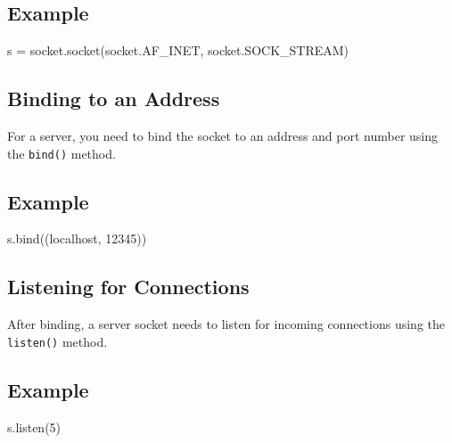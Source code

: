 \documentclass[
  letterpaper,
  DIV=11,
  numbers=noendperiod]{scrreprt}
\newenvironment{Shaded}{\begin{snugshade}}{\end{snugshade}}
\newcommand{\DecValTok}[1]{\textcolor[rgb]{0.68,0.00,0.00}{#1}}
\newcommand{\NormalTok}[1]{\textcolor[rgb]{0.00,0.23,0.31}{#1}}
\newcommand{\OperatorTok}[1]{\textcolor[rgb]{0.37,0.37,0.37}{#1}}
\newcommand{\StringTok}[1]{\textcolor[rgb]{0.13,0.47,0.30}{#1}}
\begin{document}
\subsection{Example}\label{example-10}

\begin{Shaded}
\begin{Highlighting}[]
\NormalTok{s }\OperatorTok{=}\NormalTok{ socket.socket(socket.AF\_INET, socket.SOCK\_STREAM)}
\end{Highlighting}
\end{Shaded}

\subsection{Binding to an Address}\label{binding-to-an-address}

For a server, you need to bind the socket to an address and port number
using the \texttt{bind()} method.

\subsection{Example}\label{example-11}

\begin{Shaded}
\begin{Highlighting}[]
\NormalTok{s.bind((}\StringTok{\textquotesingle{}localhost\textquotesingle{}}\NormalTok{, }\DecValTok{12345}\NormalTok{))}
\end{Highlighting}
\end{Shaded}

\subsection{Listening for Connections}\label{listening-for-connections}

After binding, a server socket needs to listen for incoming connections
using the \texttt{listen()} method.

\subsection{Example}\label{example-12}

\begin{Shaded}
\begin{Highlighting}[]
\NormalTok{s.listen(}\DecValTok{5}\NormalTok{)}
\end{Highlighting}
\end{Shaded}
\end{document}

